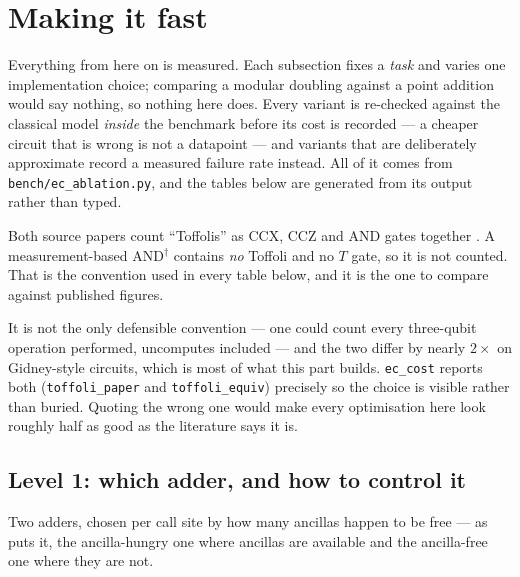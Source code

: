 \documentclass[11pt]{article}
\newcommand{\code}[1]{\texttt{#1}}
\theoremstyle{plain}
\theoremstyle{remark}
\begin{document}
\section{Making it fast}\label{ec:sec:fast}

Everything from here on is measured. Each subsection fixes a \emph{task} and varies one
implementation choice; comparing a modular doubling against a point addition would say nothing, so
nothing here does. Every variant is re-checked against the classical model \emph{inside} the
benchmark before its cost is recorded --- a cheaper circuit that is wrong is not a datapoint ---
and variants that are deliberately approximate record a measured failure rate instead. All of it
comes from \code{bench/ec\_ablation.py}, and the tables below are generated from its output rather
than typed.

\begin{keybox}[title={Which Toffoli count, and why it matters here more than in Part V}]
Both source papers count ``Toffolis'' as CCX, CCZ and AND gates together
\cite{ec:schrott26}. A measurement-based AND$^\dagger$ contains \emph{no} Toffoli and no $T$ gate,
so it is not counted. That is the convention used in every table below, and it is the one to
compare against published figures.

It is not the only defensible convention --- one could count every three-qubit operation performed,
uncomputes included --- and the two differ by nearly $2\times$ on Gidney-style circuits, which is
most of what this part builds. \code{ec\_cost} reports both (\code{toffoli\_paper} and
\code{toffoli\_equiv}) precisely so the choice is visible rather than buried. Quoting the wrong one
would make every optimisation here look roughly half as good as the literature says it is.
\end{keybox}

\subsection{Level 1: which adder, and how to control it}\label{ec:sec:fastadd}

Two adders, chosen per call site by how many ancillas happen to be free --- as \cite{ec:schrott26}
puts it, the ancilla-hungry one where ancillas are available and the ancilla-free one where they
are not.
\end{document}
